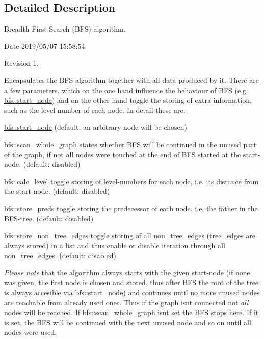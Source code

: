 \subsection{Detailed Description}
Breadth-\/\+First-\/\+Search (B\+FS) algorithm. 

\begin{DoxyParagraph}{Date}
2019/05/07 15\+:58\+:54 
\end{DoxyParagraph}
\begin{DoxyParagraph}{Revision}
1. 
\end{DoxyParagraph}


Encapsulates the B\+FS algorithm together with all data produced by it. There are a few parameters, which on the one hand influence the behaviour of B\+FS (e.\+g. \mbox{\hyperlink{classbfs_aecb495d5cc06f8a0f89239d70668abba}{bfs\+::start\+\_\+node}}) and on the other hand toggle the storing of extra information, such as the level-\/number of each node. In detail these are\+:
\begin{DoxyItemize}
\item \mbox{\hyperlink{classbfs_aecb495d5cc06f8a0f89239d70668abba}{bfs\+::start\+\_\+node}} (default\+: an arbitrary node will be chosen)
\item \mbox{\hyperlink{classbfs_ac58d930764e6aa859fe706b1d916b9ad}{bfs\+::scan\+\_\+whole\+\_\+graph}} states whether B\+FS will be continued in the unused part of the graph, if not all nodes were touched at the end of B\+FS started at the start-\/node. (default\+: disabled)
\item \mbox{\hyperlink{classbfs_aa02df0b00c5fbaa29b9a41a211732e0f}{bfs\+::calc\+\_\+level}} toggle storing of level-\/numbers for each node, i.\+e. its distance from the start-\/node. (default\+: disabled)
\item \mbox{\hyperlink{classbfs_aa7200a3b11a17b8c87675b1a9bc010aa}{bfs\+::store\+\_\+preds}} toggle storing the predecessor of each node, i.\+e. the father in the B\+F\+S-\/tree. (default\+: disabled)
\item \mbox{\hyperlink{classbfs_afed1aa751dbea4b6fb9dbdcea24b04f2}{bfs\+::store\+\_\+non\+\_\+tree\+\_\+edges}} toggle storing of all non\+\_\+tree\+\_\+edges (tree\+\_\+edges are always stored) in a list and thus enable or disable iteration through all non\+\_\+tree\+\_\+edges. (default\+: disabled)
\end{DoxyItemize}

{\itshape Please} {\itshape note} that the algorithm always starts with the given start-\/node (if none was given, the first node is chosen and stored, thus after B\+FS the root of the tree is always accesible via \mbox{\hyperlink{classbfs_aecb495d5cc06f8a0f89239d70668abba}{bfs\+::start\+\_\+node}}) and continues until no more unused nodes are reachable from already used ones. Thus if the graph isn\textquotesingle{}t connected not {\itshape all} nodes will be reached. If \mbox{\hyperlink{classbfs_ac58d930764e6aa859fe706b1d916b9ad}{bfs\+::scan\+\_\+whole\+\_\+graph}} isn\textquotesingle{}t set the B\+FS stops here. If it is set, the B\+FS will be continued with the next unused node and so on until all nodes were used.

